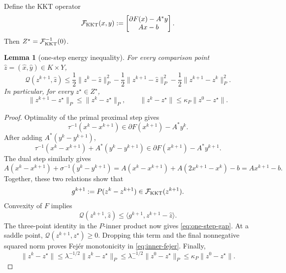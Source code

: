 \documentclass[letterpaper]{article} %
\newtheorem{lemma}[theorem]{Lemma} %
\theoremstyle{definition}
\theoremstyle{remark}
\begin{document}
Define the KKT operator
\begin{equation}
\label{eq:theory-kkt-operator}
    \mathcal F_{\rm KKT}(x,y)
    :=
    \begin{bmatrix}
        \partial F(x)-A^*y\\
        Ax-b
    \end{bmatrix}.
\end{equation}
Then $Z^\star=\mathcal F_{\rm KKT}^{-1}(0)$.

\begin{lemma}[one-step energy inequality]
\label{lem:one-step-energy}
For every comparison point
$\widehat z=(\widehat x,\widehat y)\in K\times Y$,
\begin{equation}
\label{eq:one-step-gap}
    \mathcal Q(z^{k+1},\widehat z)
    \le
    \frac12\|z^k-\widehat z\|_P^2
    -
    \frac12\|z^{k+1}-\widehat z\|_P^2
    -
    \frac12\|z^{k+1}-z^k\|_P^2.
\end{equation}
In particular, for every $z^\star\in Z^\star$,
\begin{equation}
\label{eq:inner-fejer}
    \|z^{k+1}-z^\star\|_P
    \le
    \|z^k-z^\star\|_P,
    \qquad
    \|z^k-z^\star\|
    \le
    \kappa_P\|z^0-z^\star\|.
\end{equation}
\end{lemma}

\begin{proof}
Optimality of the primal proximal step gives
\[
    \tau^{-1}(x^k-x^{k+1})
    \in
    \partial F(x^{k+1})-A^*y^k.
\]
After adding $A^*(y^k-y^{k+1})$,
\[
    \tau^{-1}(x^k-x^{k+1})
    +
    A^*(y^k-y^{k+1})
    \in
    \partial F(x^{k+1})-A^*y^{k+1}.
\]
The dual step similarly gives
\[
    A(x^k-x^{k+1}) + \sigma^{-1}(y^k-y^{k+1}) = A(x^k-x^{k+1}) + A(2x^{k+1}-x^k)-b = Ax^{k+1}-b.
\]
Together, these two relations show that
\[
    g^{k+1}
    :=
    P(z^k-z^{k+1})
    \in
    \mathcal F_{\rm KKT}(z^{k+1}).
\]
Convexity of $F$ implies
\[
    \mathcal Q(z^{k+1},\widehat z)
    \le
    \langle g^{k+1},z^{k+1}-\widehat z\rangle.
\]
The three-point identity in the $P$-inner product now gives
\eqref{eq:one-step-gap}.  At a saddle point,
$\mathcal Q(z^{k+1},z^\star)\ge0$.  Dropping this term and the final
nonnegative squared norm proves Fej\'er monotonicity in
\eqref{eq:inner-fejer}.  Finally,
\[
    \|z^k-z^\star\|
    \le
    \lambda_-^{-1/2}\|z^k-z^\star\|_P
    \le
    \lambda_-^{-1/2}\|z^0-z^\star\|_P
    \le
    \kappa_P\|z^0-z^\star\|.
\]
\end{proof}
\end{document}
